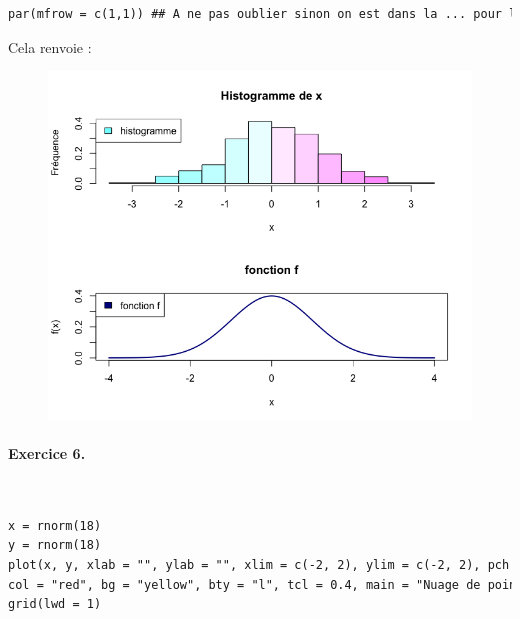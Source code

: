 \begin{enumerate}
\begin{lstlisting}[language=html]
par(mfrow = c(1,1)) ## A ne pas oublier sinon on est dans la ... pour les graphiques suivants
\end{lstlisting}
Cela renvoie :
\begin{figure}[H]\begin{center}\includegraphics[scale=0.4]{ilu/gra94.png}\end{center}\end{figure}
\end{enumerate}

\paragraph{Exercice 6. }\textcolor{white}{.}\newline

\begin{lstlisting}[language=html]
x = rnorm(18)
y = rnorm(18)
plot(x, y, xlab = "", ylab = "", xlim = c(-2, 2), ylim = c(-2, 2), pch = 22,
col = "red", bg = "yellow", bty = "l", tcl = 0.4, main = "Nuage de points")
grid(lwd = 1)
\end{lstlisting}

